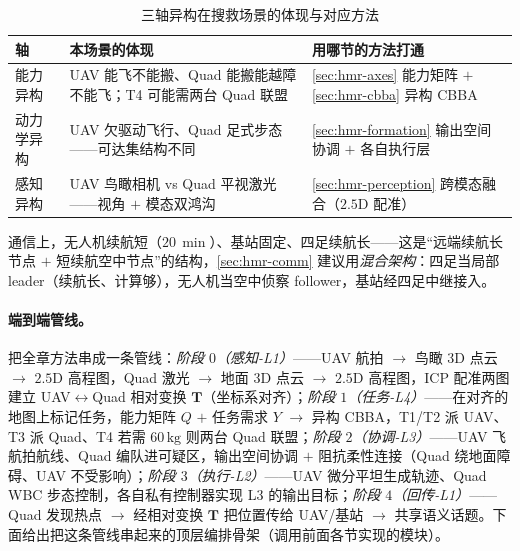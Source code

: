 \begin{table}[H]\centering\small
\caption{三轴异构在搜救场景的体现与对应方法}
\label{tab:hmr-case-axes}
\begin{tabular}{lll}
\toprule
轴 & 本场景的体现 & 用哪节的方法打通 \\
\midrule
能力异构 & UAV 能飞不能搬、Quad 能搬能越障不能飞；T4 可能需两台 Quad 联盟 & \cref{sec:hmr-axes} 能力矩阵 $+$ \cref{sec:hmr-cbba} 异构 CBBA \\
动力学异构 & UAV 欠驱动飞行、Quad 足式步态——可达集结构不同 & \cref{sec:hmr-formation} 输出空间协调 $+$ 各自执行层 \\
感知异构 & UAV 鸟瞰相机 vs Quad 平视激光——视角 $+$ 模态双鸿沟 & \cref{sec:hmr-perception} 跨模态融合（$2.5\mathrm{D}$ 配准） \\
\bottomrule
\end{tabular}
\end{table}

\noindent 通信上，无人机续航短（$20\,\min$）、基站固定、四足续航长——这是“远端续航长节点 $+$ 短续航空中节点”的结构，\cref{sec:hmr-comm} 建议用\emph{混合架构}：四足当局部 leader（续航长、计算够），无人机当空中侦察 follower，基站经四足中继接入。

\paragraph{端到端管线。}
把全章方法串成一条管线：\emph{阶段 $0$（感知-L1）}——UAV 航拍 $\to$ 鸟瞰 3D 点云 $\to$ $2.5\mathrm{D}$ 高程图，Quad 激光 $\to$ 地面 3D 点云 $\to$ $2.5\mathrm{D}$ 高程图，ICP 配准两图建立 UAV$\leftrightarrow$Quad 相对变换 $\mathbf{T}$（坐标系对齐）；\emph{阶段 $1$（任务-L4）}——在对齐的地图上标记任务，能力矩阵 $Q$ $+$ 任务需求 $Y$ $\to$ 异构 CBBA，T1/T2 派 UAV、T3 派 Quad、T4 若需 $60\,\mathrm{kg}$ 则两台 Quad 联盟；\emph{阶段 $2$（协调-L3）}——UAV 飞航拍航线、Quad 编队进可疑区，输出空间协调 $+$ 阻抗柔性连接（Quad 绕地面障碍、UAV 不受影响）；\emph{阶段 $3$（执行-L2）}——UAV 微分平坦生成轨迹、Quad WBC 步态控制，各自私有控制器实现 L3 的输出目标；\emph{阶段 $4$（回传-L1）}——Quad 发现热点 $\to$ 经相对变换 $\mathbf{T}$ 把位置传给 UAV/基站 $\to$ 共享语义话题。下面给出把这条管线串起来的顶层编排骨架（调用前面各节实现的模块）。

